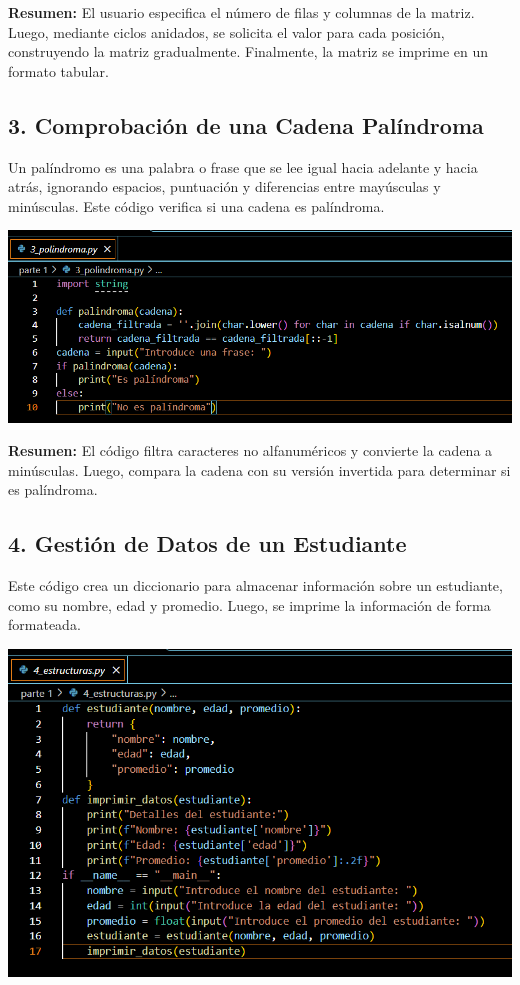 \documentclass{article}
\begin{document}
\noindent \textbf{Resumen:} El usuario especifica el número de filas y columnas de la matriz. Luego, mediante ciclos anidados, se solicita el valor para cada posición, construyendo la matriz gradualmente. Finalmente, la matriz se imprime en un formato tabular.

\subsection*{3. Comprobación de una Cadena Palíndroma}
Un palíndromo es una palabra o frase que se lee igual hacia adelante y hacia atrás, ignorando espacios, puntuación y diferencias entre mayúsculas y minúsculas. Este código verifica si una cadena es palíndroma.

\begin{center}
\includegraphics[width=\textwidth]{codigo3.jpg} %
\end{center}

\noindent \textbf{Resumen:} El código filtra caracteres no alfanuméricos y convierte la cadena a minúsculas. Luego, compara la cadena con su versión invertida para determinar si es palíndroma.

\subsection*{4. Gestión de Datos de un Estudiante}
Este código crea un diccionario para almacenar información sobre un estudiante, como su nombre, edad y promedio. Luego, se imprime la información de forma formateada.

\begin{center}
\includegraphics[width=\textwidth]{codigo4.jpg} %
\end{center}
\end{document}
